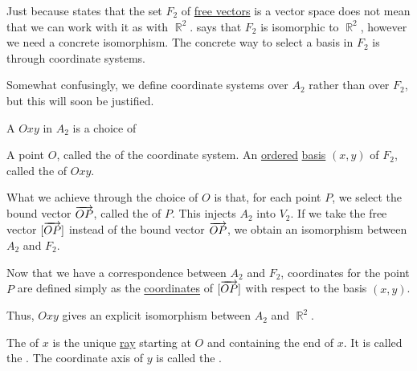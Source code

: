 \begin{definition}\label{def:euclidean_plane_coordinate_system}
  Just because  states that the set \( F_2 \) of \hyperref[def:euclidean_plane_free_vector]{free vectors} is a vector space does not mean that we can work with it as with \( \BbbR^2 \).  says that \( F_2 \) is isomorphic to \( \BbbR^2 \), however we need a concrete isomorphism. The concrete way to select a basis in \( F_2 \) is through coordinate systems.

  Somewhat confusingly, we define coordinate systems over \( A_2 \) rather than over \( F_2 \), but this will soon be justified.

  A  \( Oxy \) in \( A_2 \) is a choice of
  \begin{thmenum}
     A point \( O \), called the  of the coordinate system.
     An \hyperref[def:partially_ordered_set]{ordered} \hyperref[def:hamel_basis]{basis} \( (x, y) \) of \( F_2 \), called the  of \( Oxy \).
  \end{thmenum}

  What we achieve through the choice of \( O \) is that, for each point \( P \), we select the bound vector \( \overrightarrow{OP} \), called the  of \( P \). This injects \( A_2 \) into \( V_2 \). If we take the free vector \( [\overrightarrow{OP}] \) instead of the bound vector \( \overrightarrow{OP} \), we obtain an isomorphism between \( A_2 \) and \( F_2 \).

  Now that we have a correspondence between \( A_2 \) and \( F_2 \), coordinates for the point \( P \) are defined simply as the \hyperref[def:basis_decomposition]{coordinates} of \( [\overrightarrow{OP}] \) with respect to the basis \( (x, y) \).

  Thus, \( Oxy \) gives an explicit isomorphism between \( A_2 \) and \( \BbbR^2 \).

  The  of \( x \) is the unique \hyperref[def:euclidean_plane/ray]{ray} starting at \( O \) and containing the end of \( x \). It is called the . The coordinate axis of \( y \) is called the .
\end{definition}

